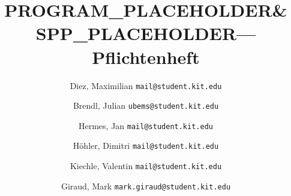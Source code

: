 \documentclass[a4paper]{scrreprt}
\newcommand{\sppname}{SPP\_PLACEHOLDER}
\newcommand{\programname}{PROGRAM\_PLACEHOLDER}
\begin{document}
\title{\programname \& \sppname --- Pflichtenheft}
\author{
    Diez, Maximilian
    \texttt{mail@student.kit.edu}
    \and
    Brendl, Julian
    \texttt{ubems@student.kit.edu}
    \and
    Hermes, Jan
    \texttt{mail@student.kit.edu}
    \and
    Höhler, Dimitri
    \texttt{mail@student.kit.edu}
    \and
    Kiechle, Valentin
    \texttt{mail@student.kit.edu}
    \and
    Giraud, Mark
    \texttt{mark.giraud@student.kit.edu}
}
\maketitle



\newpage
\tableofcontents
\newpage



















\appendix

\end{document}
